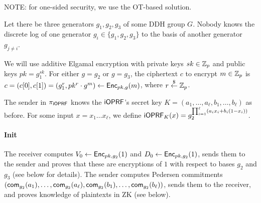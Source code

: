 \documentclass{article}
\begin{document}
NOTE: for one-sided security, we use the OT-based solution.

Let there be three generators $g_1,g_2,g_3$ of some DDH group $G$. Nobody
knows the discrete log of one generator $g_i\in\{g_1,g_2,g_3\}$ to
the basis of another generator $g_{j\neq{}i}$.

We will use additive Elgamal encryption with private keys $sk\in\mathbb{Z}_p$
and public keys $pk=g_1^{sk}$. For either $g=g_2$ or $g=g_3$, the
ciphertext $c$ to encrypt $m\in\mathbb{Z}_p$ is
$c=(c[0],c[1])=(g_1^r,pk^r\cdot{}g^m)\leftarrow{\mathsf{Enc}}_{pk,g}(m)$, where
$r\stackrel{\$}{\leftarrow}\mathbb{Z}_p$.

The sender in ${\pi_{\mathsf{i}\mathsf{OPRF}}}$ knows the $\mathsf{i}\mathsf{OPRF}$'s secret key
$K=(a_1,\ldots,a_\ell,b_1,\ldots,b_\ell)$ as before. For some input
$x=x_1\ldots{}x_\ell$, we define
$\mathsf{i}\mathsf{OPRF}_K(x)=g_2^{\prod_{i=1}^{\ell}(a_ix_i+b_i(1-x_i))}$.

\paragraph{Init}
The receiver computes $V_0 \leftarrow{\mathsf{Enc}}_{pk,g_2}(1)$ and
$D_0\leftarrow{\mathsf{Enc}}_{pk,g_2}(1)$, sends them to the sender and proves
that these are encryptions of $1$ with respect to bases $g_2$ and
$g_3$ (see below for details). The sender computes Pedersen
commitments
$(\mathsf{com}_{g_2}(a_1),\ldots,\mathsf{com}_{g_2}(a_\ell),\mathsf{com}_{g_2}(b_1),\ldots,\mathsf{com}_{g_2}(b_\ell))$,
sends them to the receiver, and proves knowledge of plaintexts in ZK
(see below).
\end{document}
